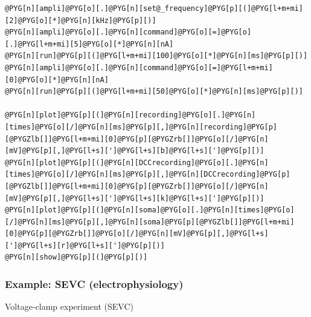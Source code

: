 \documentclass[letterpaper,10pt,english]{manual}
\begin{document}
\begin{Verbatim}[commandchars=@\[\]]
@PYG[n][ampli]@PYG[o][.]@PYG[n][set@_frequency]@PYG[p][(]@PYG[l+m+mi][2]@PYG[o][*]@PYG[n][kHz]@PYG[p][)]
@PYG[n][ampli]@PYG[o][.]@PYG[n][command]@PYG[o][=]@PYG[o][.]@PYG[l+m+mi][5]@PYG[o][*]@PYG[n][nA]
@PYG[n][run]@PYG[p][(]@PYG[l+m+mi][100]@PYG[o][*]@PYG[n][ms]@PYG[p][)]
@PYG[n][ampli]@PYG[o][.]@PYG[n][command]@PYG[o][=]@PYG[l+m+mi][0]@PYG[o][*]@PYG[n][nA]
@PYG[n][run]@PYG[p][(]@PYG[l+m+mi][50]@PYG[o][*]@PYG[n][ms]@PYG[p][)]

@PYG[n][plot]@PYG[p][(]@PYG[n][recording]@PYG[o][.]@PYG[n][times]@PYG[o][/]@PYG[n][ms]@PYG[p][,]@PYG[n][recording]@PYG[p][@PYGZlb[]]@PYG[l+m+mi][0]@PYG[p][@PYGZrb[]]@PYG[o][/]@PYG[n][mV]@PYG[p][,]@PYG[l+s][']@PYG[l+s][b]@PYG[l+s][']@PYG[p][)]
@PYG[n][plot]@PYG[p][(]@PYG[n][DCCrecording]@PYG[o][.]@PYG[n][times]@PYG[o][/]@PYG[n][ms]@PYG[p][,]@PYG[n][DCCrecording]@PYG[p][@PYGZlb[]]@PYG[l+m+mi][0]@PYG[p][@PYGZrb[]]@PYG[o][/]@PYG[n][mV]@PYG[p][,]@PYG[l+s][']@PYG[l+s][k]@PYG[l+s][']@PYG[p][)]
@PYG[n][plot]@PYG[p][(]@PYG[n][soma]@PYG[o][.]@PYG[n][times]@PYG[o][/]@PYG[n][ms]@PYG[p][,]@PYG[n][soma]@PYG[p][@PYGZlb[]]@PYG[l+m+mi][0]@PYG[p][@PYGZrb[]]@PYG[o][/]@PYG[n][mV]@PYG[p][,]@PYG[l+s][']@PYG[l+s][r]@PYG[l+s][']@PYG[p][)]
@PYG[n][show]@PYG[p][(]@PYG[p][)]
\end{Verbatim}

\resetcurrentobjects
\hypertarget{--doc-examples-electrophysiology_SEVC}{}

\hypertarget{index-24}{}\subsubsection{Example: SEVC (electrophysiology)}

Voltage-clamp experiment (SEVC)
\end{document}
